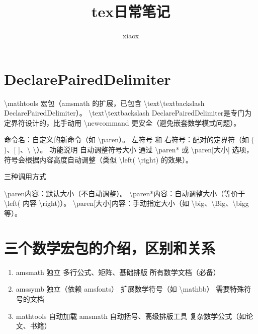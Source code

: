 \documentclass[UTF8]{ctexart}
\title{tex日常笔记}
\author{xiaox}
\begin{document}
\maketitle
\tableofcontents
\newpage
\pagestyle{plain}


\section{DeclarePairedDelimiter}

\textbackslash mathtools 宏包（amsmath 的扩展，已包含 \textbackslash text{\textbackslash textbackslash DeclarePairedDelimiter}）。
\textbackslash text{\textbackslash textbackslash DeclarePairedDelimiter}是专门为定界符设计的，比手动用 \textbackslash newcommand 更安全（避免嵌套数学模式问题）。

命令名：自定义的新命令（如 \textbackslash paren）。
左符号 和 右符号：配对的定界符（如 ( )、[ ]、\textbackslash { \textbackslash }）。
功能说明
自动调整符号大小
通过 \textbackslash  paren* 或 \textbackslash  paren[大小] 选项，符号会根据内容高度自动调整（类似 \textbackslash left( \textbackslash right) 的效果）。

三种调用方式

\textbackslash paren{内容}：默认大小（不自动调整）。
\textbackslash paren*{内容}：自动调整大小（等价于 \textbackslash left( 内容 \textbackslash right)）。
\textbackslash paren[大小]{内容}：手动指定大小（如 \textbackslash big、\textbackslash Big、\textbackslash bigg 等）。

\section{三个数学宏包的介绍，区别和关系}
\begin{enumerate}
 \item amsmath	独立	多行公式、矩阵、基础排版	所有数学文档（必备）
  \item amssymb	独立（依赖 amsfonts）	扩展数学符号（如 \textbackslash mathbb）	需要特殊符号的文档
   \item mathtools	自动加载 amsmath	自动括号、高级排版工具	复杂数学公式（如论文、书籍）
\end{enumerate}
\end{document}
